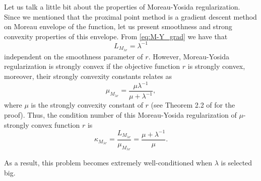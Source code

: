 Let us talk a little bit about the properties of Moreau-Yosida regularization. Since we mentioned that the proximal point method is a gradient descent method on Moreau envelope of the function, let us present smoothness and strong convexity properties of this envelope. From \eqref{eq:M-Y_grad} we have that 
\begin{equation}\label{eq:M-Y_smoothness}
L_{M_{\lambda r}} = \lambda^{-1}
\end{equation}
independent on the smoothness parameter of $r$. However, Moreau-Yosida regularization is strongly convex if the objective function $r$ is strongly convex, moreover, their strongly convexity constants relates as
\begin{equation}\label{eq:M-Y_strongly}
\mu_{M_{\lambda r}} = \frac{\mu\lambda^{-1}}{\mu + \lambda^{-1}},
\end{equation}
where $\mu$ is the strongly convexity constant of $r$ (see Theorem 2.2 of \cite{lemarechal1997practical} for the proof). Thus, the condition number of this Moreau-Yosida regularization of $\mu$-strongly convex function $r$ is 
\begin{equation}\label{eq:M-Y_condition}
\kappa_{M_{\lambda r}} = \frac{L_{M_{\lambda r}}}{\mu_{M_{\lambda r}}} = \frac{\mu + \lambda^{-1}}{\mu}.
\end{equation}

As a result, this problem becomes extremely well-conditioned when $\lambda$ is selected big.






